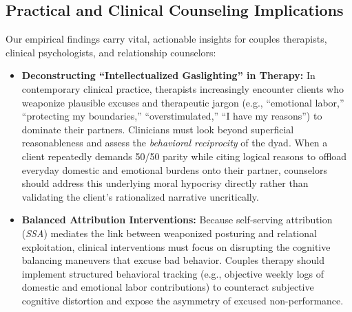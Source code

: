 \subsection{Practical and Clinical Counseling Implications}
Our empirical findings carry vital, actionable insights for couples therapists, clinical psychologists, and relationship counselors:
\begin{itemize}[leftmargin=*]
    \item \textbf{Deconstructing ``Intellectualized Gaslighting'' in Therapy:} In contemporary clinical practice, therapists increasingly encounter clients who weaponize plausible excuses and therapeutic jargon (e.g., ``emotional labor,'' ``protecting my boundaries,'' ``overstimulated,'' ``I have my reasons'') to dominate their partners. Clinicians must look beyond superficial reasonableness and assess the \textit{behavioral reciprocity} of the dyad. When a client repeatedly demands 50/50 parity while citing logical reasons to offload everyday domestic and emotional burdens onto their partner, counselors should address this underlying moral hypocrisy directly rather than validating the client's rationalized narrative uncritically.
    \item \textbf{Balanced Attribution Interventions:} Because self-serving attribution (\textit{SSA}) mediates the link between weaponized posturing and relational exploitation, clinical interventions must focus on disrupting the cognitive balancing maneuvers that excuse bad behavior. Couples therapy should implement structured behavioral tracking (e.g., objective weekly logs of domestic and emotional labor contributions) to counteract subjective cognitive distortion and expose the asymmetry of excused non-performance.
\end{itemize}

